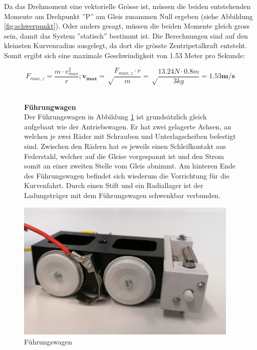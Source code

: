 \documentclass[../../main.tex]{subfiles}
\begin{document}
Da das Drehmoment eine vektorielle Grösse ist, müssen die beiden entstehenden Momente am Drehpunkt ''P'' am Gleis zusammen Null ergeben (siehe Abbildung \ref{fig:schwerpunkt}). Oder anders gesagt, müssen die beiden Momente gleich gross sein, damit das System ''statisch'' bestimmt ist. Die Berechnungen sind auf den kleinsten Kurvenradius ausgelegt, da dort die grösste Zentripetalkraft entsteht. Somit ergibt sich eine maximale Geschwindigkeit von 1.53 Meter pro Sekunde:

$$F_{max, z}=\frac{m \cdot v_{max}^2}{r};\boldsymbol{v_{max}}=\sqrt\frac{F_{max, z}\cdot r}{m}=\sqrt\frac{13.24N \cdot 0.8m}{3kg}=\boldsymbol{1.53m/s}$$\\

\begin{figure}[H]
  \begin{minipage}{.5\textwidth}
    \textbf{Führungwagen}\\
    Der Führungswagen in Abbildung \ref{fig:fuehrungswagen1} ist grundsätzlich gleich aufgebaut wie der Antriebswagen. Er hat zwei gelagerte Achsen, an welchen je zwei Räder mit Schrauben und Unterlagscheiben befestigt sind. Zwischen den Rädern hat es jeweils einen Schleifkontakt aus Federstahl, welcher auf die Gleise vorgespannt ist und den Strom somit an einer zweiten Stelle vom Gleis abnimmt. Am hinteren Ende des Führungswagen befindet sich wiederum die Vorrichtung für die Kurvenfahrt. Durch einen Stift und ein Radiallager ist der Ladungsträger mit dem Führungswagen schwenkbar verbunden.
   \end{minipage}
  \begin{minipage}{.5\textwidth}
    \flushright
    \includegraphics[width=0.95\textwidth]{fuehrungswagen2.JPG}
    \caption {Führungswagen}
    \label{fig:fuehrungswagen1}
    \end{minipage} 
\end{figure} 
\end{document}
